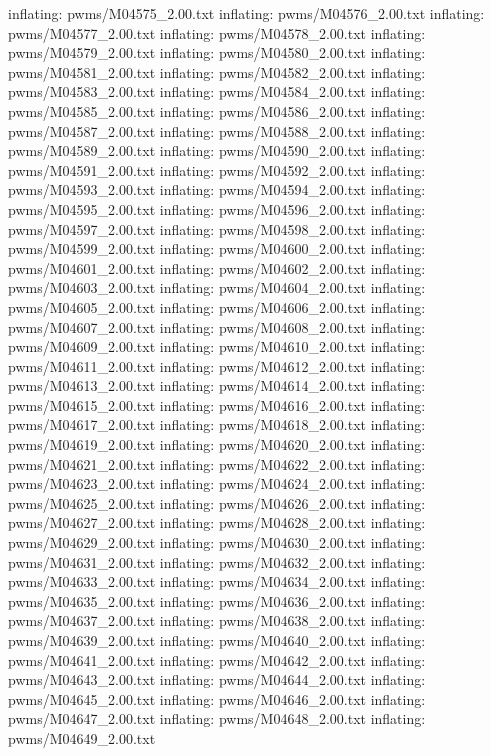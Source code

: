 \documentclass[letterpaper,10pt,english]{sphinxmanual}
\begin{document}
{\begin{sphinxVerbatim}[commandchars=\\\{\}]
  inflating: pwms/M04575\_2.00.txt
  inflating: pwms/M04576\_2.00.txt
  inflating: pwms/M04577\_2.00.txt
  inflating: pwms/M04578\_2.00.txt
  inflating: pwms/M04579\_2.00.txt
  inflating: pwms/M04580\_2.00.txt
  inflating: pwms/M04581\_2.00.txt
  inflating: pwms/M04582\_2.00.txt
  inflating: pwms/M04583\_2.00.txt
  inflating: pwms/M04584\_2.00.txt
  inflating: pwms/M04585\_2.00.txt
  inflating: pwms/M04586\_2.00.txt
  inflating: pwms/M04587\_2.00.txt
  inflating: pwms/M04588\_2.00.txt
  inflating: pwms/M04589\_2.00.txt
  inflating: pwms/M04590\_2.00.txt
  inflating: pwms/M04591\_2.00.txt
  inflating: pwms/M04592\_2.00.txt
  inflating: pwms/M04593\_2.00.txt
  inflating: pwms/M04594\_2.00.txt
  inflating: pwms/M04595\_2.00.txt
  inflating: pwms/M04596\_2.00.txt
  inflating: pwms/M04597\_2.00.txt
  inflating: pwms/M04598\_2.00.txt
  inflating: pwms/M04599\_2.00.txt
  inflating: pwms/M04600\_2.00.txt
  inflating: pwms/M04601\_2.00.txt
  inflating: pwms/M04602\_2.00.txt
  inflating: pwms/M04603\_2.00.txt
  inflating: pwms/M04604\_2.00.txt
  inflating: pwms/M04605\_2.00.txt
  inflating: pwms/M04606\_2.00.txt
  inflating: pwms/M04607\_2.00.txt
  inflating: pwms/M04608\_2.00.txt
  inflating: pwms/M04609\_2.00.txt
  inflating: pwms/M04610\_2.00.txt
  inflating: pwms/M04611\_2.00.txt
  inflating: pwms/M04612\_2.00.txt
  inflating: pwms/M04613\_2.00.txt
  inflating: pwms/M04614\_2.00.txt
  inflating: pwms/M04615\_2.00.txt
  inflating: pwms/M04616\_2.00.txt
  inflating: pwms/M04617\_2.00.txt
  inflating: pwms/M04618\_2.00.txt
  inflating: pwms/M04619\_2.00.txt
  inflating: pwms/M04620\_2.00.txt
  inflating: pwms/M04621\_2.00.txt
  inflating: pwms/M04622\_2.00.txt
  inflating: pwms/M04623\_2.00.txt
  inflating: pwms/M04624\_2.00.txt
  inflating: pwms/M04625\_2.00.txt
  inflating: pwms/M04626\_2.00.txt
  inflating: pwms/M04627\_2.00.txt
  inflating: pwms/M04628\_2.00.txt
  inflating: pwms/M04629\_2.00.txt
  inflating: pwms/M04630\_2.00.txt
  inflating: pwms/M04631\_2.00.txt
  inflating: pwms/M04632\_2.00.txt
  inflating: pwms/M04633\_2.00.txt
  inflating: pwms/M04634\_2.00.txt
  inflating: pwms/M04635\_2.00.txt
  inflating: pwms/M04636\_2.00.txt
  inflating: pwms/M04637\_2.00.txt
  inflating: pwms/M04638\_2.00.txt
  inflating: pwms/M04639\_2.00.txt
  inflating: pwms/M04640\_2.00.txt
  inflating: pwms/M04641\_2.00.txt
  inflating: pwms/M04642\_2.00.txt
  inflating: pwms/M04643\_2.00.txt
  inflating: pwms/M04644\_2.00.txt
  inflating: pwms/M04645\_2.00.txt
  inflating: pwms/M04646\_2.00.txt
  inflating: pwms/M04647\_2.00.txt
  inflating: pwms/M04648\_2.00.txt
  inflating: pwms/M04649\_2.00.txt

\end{sphinxVerbatim}}
\end{document}

